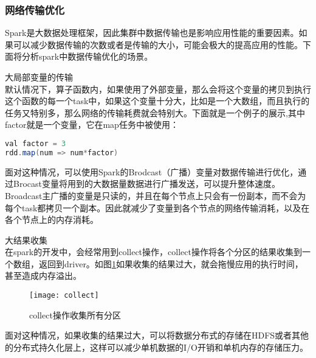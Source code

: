 \subsubsection{网络传输优化}
Spark是大数据处理框架，因此集群中数据传输也是影响应用性能的重要因素。如果可以减少数据传输的次数或者是传输的大小，可能会极大的提高应用的性能。下面将分析spark中数据传输优化的场景。
\begin{compactenum}
\item 大局部变量的传输\\默认情况下，算子函数内，如果使用了外部变量，那么会将这个变量的拷贝到执行这个函数的每一个task中，如果这个变量十分大，比如是一个大数组，而且执行的任务又特别多，那么网络的传输耗费就会特别大。下面就是一个例子的展示,其中factor就是一个变量，它在map任务中被使用：
\begin{lstlisting}[language=Java,numbers=none,frame=none]
val factor = 3
rdd.map(num => num*factor)
\end{lstlisting}

面对这种情况，可以使用Spark的Brodcast（广播）变量对数据传输进行优化，通过Brocast变量将用到的大数据量数据进行广播发送，可以提升整体速度。Broadcast主广播的变量是只读的，并且在每个节点上只会有一份副本，而不会为每个task都拷贝一个副本。因此就减少了变量到各个节点的网络传输消耗，以及在各个节点上的内存消耗。
\item 大结果收集\\在spark的开发中，会经常用到collect操作，collect操作将各个分区的结果收集到一个数组，返回到driver。如图\ref{fig:collect}如果收集的结果过大，就会拖慢应用的执行时间，甚至造成内存溢出。
\begin{figure}[htp]
\centering
\texttt{[image: collect]}
\caption{collect操作收集所有分区}
\label{fig:collect}
\end{figure}
面对这种情况，如果收集的结果过大，可以将数据分布式的存储在HDFS或者其他的分布式持久化层上，这样可以减少单机数据的I/O开销和单机内存的存储压力。
\end{compactenum}

